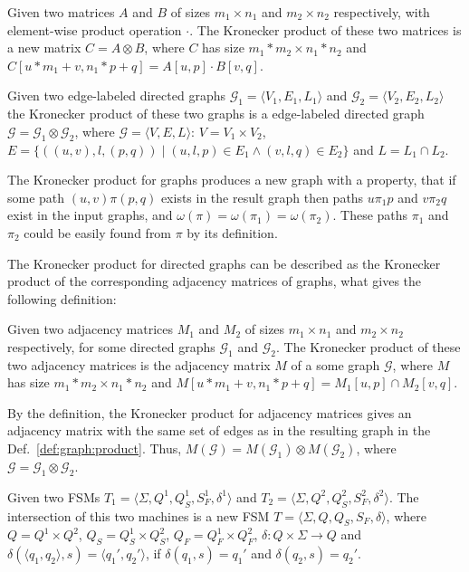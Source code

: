 \begin{definition}
Given two matrices $A$ and $B$ of sizes $m_1 \times n_1$ and $m_2 \times n_2$
respectively, with element-wise product operation $\cdot$.
The Kronecker product of these two matrices is a new matrix $C = A \otimes B$, where $C$ has size $m_1 * m_2 \times n_1 * n_2$ and $C[u * m_1 + v,n_1 * p + q] = A[u,p] \cdot B[v,q]$.
\end{definition}

\begin{definition}
\label{def:graph:product}
Given two edge-labeled directed graphs $\mathcal{G}_1=\langle V_1, E_1, L_1 \rangle$
and $\mathcal{G}_2=\langle V_2, E_2, L_2 \rangle$
the Kronecker product of these two graphs is a edge-labeled directed graph
$\mathcal{G}=\mathcal{G}_1 \otimes \mathcal{G}_2$,
where $\mathcal{G}= \langle V, E, L \rangle$:  $V = V_1 \times V_2$, $E = \{((u,v),l,(p,q)) \mid (u,l,p) \in E_1 \wedge (v,l,q) \in E_2 \}$ and $L = L_1 \cap L_2$.
\end{definition}

The Kronecker product for graphs produces a new graph with a property,
that if some path $(u,v)\pi(p,q)$ exists in the result graph
then paths $u\pi_1p$ and $v\pi_2q$ exist in the input graphs,
and $\omega(\pi) = \omega(\pi_1) = \omega(\pi_2)$.
These paths $\pi_1$ and $\pi_2$ could be easily found from $\pi$ by its definition.

The Kronecker product for directed graphs can be described as
the Kronecker product of the corresponding adjacency matrices of graphs,
what gives the following definition:

\begin{definition}
Given two adjacency matrices $M_1$ and $M_2$ of sizes
$m_1 \times n_1$ and $m_2 \times n_2$ respectively,
for some directed graphs $\mathcal{G}_1$ and $\mathcal{G}_2$.
The Kronecker product of these two adjacency matrices is the adjacency matrix $M$
of a some graph $\mathcal{G}$, where $M$ has size $m_1 * m_2 \times n_1 * n_2$ and $M[u * m_1 + v,n_1 * p + q] = M_1[u,p] \cap M_2[v,q]$.
\end{definition}

By the definition, the Kronecker product for adjacency matrices gives an
adjacency matrix with the same set of edges as in the resulting graph in the
Def.~\ref{def:graph:product}. Thus, $M(\mathcal{G}) = M(\mathcal{G}_1) \otimes
M(\mathcal{G}_2)$, where $\mathcal{G} = \mathcal{G}_1 \otimes \mathcal{G}_2$.

\begin{definition}
\label{def:fsm:intersection}
Given two FSMs $T_1 = \langle \Sigma, Q^1, Q_S^1, S_F^1, \delta^1 \rangle$
and $T_2 = \langle \Sigma, Q^2, Q_S^2, S_F^2, \delta^2 \rangle$.
The intersection of this two machines is a new FSM
$T = \langle \Sigma, Q, Q_S, S_F, \delta \rangle$, where $Q = Q^1 \times Q^2$, $Q_S = Q_S^1 \times Q_S^2$, $Q_F = Q_F^1 \times Q_F^2$, $\delta: Q \times \Sigma \to Q$ and $\delta (\langle q_1, q_2 \rangle, s) = \langle q_1', q_2' \rangle$, if $\delta(q_1,s)=q_1'$ and $\delta(q_2,s)=q_2'$.
\end{definition}

